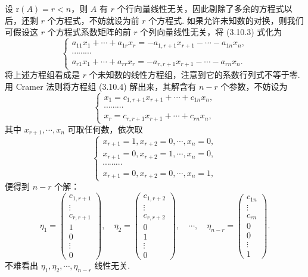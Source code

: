 \documentclass[UTF8, 12pt, fontset=fandol, oneside]{ctexart}
\begin{document}
设 $\mathrm{r}(A)=r<n$，则 $A$ 有 $r$ 个行向量线性无关，因此剔除了多余的方程式以后，还剩 $r$ 个方程式，不妨就设为前 $r$ 个方程式. 如果允许未知数的对换，则我们可假设这 $r$ 个方程式系数矩阵的前 $r$ 个列向量线性无关，将 (3.10.3) 式化为
\begin{equation}
\left\{\begin{array}{c}
a_{11}x_1+\cdots+a_{1r}x_r=-a_{1,r+1}x_{r+1}-\cdots-a_{1n}x_n,\\
\cdots\cdots\cdots\\
a_{r1}x_1+\cdots+a_{rr}x_r=-a_{r,r+1}x_{r+1}-\cdots-a_{rn}x_n.
\end{array}\right.
\tag{3.10.4}
\end{equation}
将上述方程组看成是 $r$ 个未知数的线性方程组，注意到它的系数行列式不等于零. 用 Cramer 法则将方程组 (3.10.4) 解出来，其解含有 $n-r$ 个参数，不妨设为
\begin{equation}
\left\{\begin{array}{c}
x_1=c_{1,r+1}x_{r+1}+\cdots+c_{1n}x_n,\\
\cdots\cdots\cdots\\
x_r=c_{r,r+1}x_{r+1}+\cdots+c_{rn}x_n,
\end{array}\right.
\tag{3.10.5}
\end{equation}
其中 $x_{r+1},\cdots,x_n$ 可取任何数，依次取
\[
\left\{\begin{array}{c}
x_{r+1}=1,x_{r+2}=0,\cdots,x_n=0,\\
x_{r+1}=0,x_{r+2}=1,\cdots,x_n=0,\\
\cdots\cdots\cdots\\
x_{r+1}=0,x_{r+2}=0,\cdots,x_n=1,
\end{array}\right.
\]
便得到 $n-r$ 个解：
\[
\eta_1=\left(\begin{array}{c}
c_{1,r+1}\\
\vdots\\
c_{r,r+1}\\
1\\
0\\
\vdots\\
0
\end{array}\right),\quad
\eta_2=\left(\begin{array}{c}
c_{1,r+2}\\
\vdots\\
c_{r,r+2}\\
0\\
1\\
\vdots\\
0
\end{array}\right),\quad \cdots,\quad
\eta_{n-r}=\left(\begin{array}{c}
c_{1n}\\
\vdots\\
c_{rn}\\
0\\
0\\
\vdots\\
1
\end{array}\right).
\]
不难看出 $\eta_1,\eta_2,\cdots,\eta_{n-r}$ 线性无关.
\end{document}
